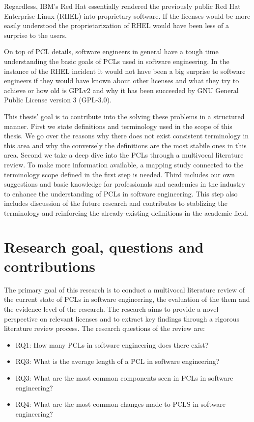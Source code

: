 Regardless, IBM's Red Hat essentially rendered the previously public Red Hat Enterprise Linux (RHEL) into proprietary software. If the licenses would be more easily understood the proprietarization of RHEL would have been less of a surprise to the users.

On top of PCL details, software engineers in general have a tough time understanding the basic goals of PCLs used in software engineering. In the instance of the RHEL incident it would not have been a big surprise to software engineers if they would have known about other licenses and what they try to achieve or how old is GPLv2 and why it has been succeeded by GNU General Public License version 3 (GPL-3.0).

This thesis' goal is to contribute into the solving these problems in a structured manner. First we state definitions and terminology used in the scope of this thesis. We go over the reasons why there does not exist consistent terminology in this area and why the conversely the definitions are the most stabile ones in this area. Second we take a deep dive into the PCLs through a multivocal literature review. To make more information available, a mapping study connected to the terminology scope defined in the first step is needed. Third includes our own suggestions and basic knowledge for professionals and academics in the industry to enhance the understanding of PCLs in software engineering. This step also includes discussion of the future research and contributes to stablizing the terminology and reinforcing the already-existing definitions in the academic field.

\section{Research goal, questions and contributions}
The primary goal of this research is to conduct a multivocal literature review of the current state of PCLs in software engineering, the evaluation of the them and the evidence level of the research. The research aims to provide a novel perspective on relevant licenses and to extract key findings through a rigorous literature review process. The research questions of the review are:
\begin{itemize}
	\item RQ1: How many PCLs in software engineering does there exist?
	\item RQ3: What is the average length of a PCL in software engineering?
	\item RQ3: What are the most common components seen in PCLs in software engineering?
	\item RQ4: What are the most common changes made to PCLS in software engineering?
\end{itemize}

